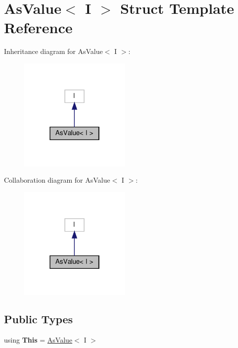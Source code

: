 \hypertarget{structAsValue}{}\section{As\+Value$<$ I $>$ Struct Template Reference}
\label{structAsValue}


Inheritance diagram for As\+Value$<$ I $>$\+:
\nopagebreak
\begin{figure}[H]
\begin{center}
\leavevmode
\includegraphics[width=154pt]{structAsValue__inherit__graph}
\end{center}
\end{figure}


Collaboration diagram for As\+Value$<$ I $>$\+:
\nopagebreak
\begin{figure}[H]
\begin{center}
\leavevmode
\includegraphics[width=154pt]{structAsValue__coll__graph}
\end{center}
\end{figure}
\subsection*{Public Types}
\begin{DoxyCompactItemize}
\item 
\mbox{\label{structAsValue_ac193a16f2751f437dc0a6d2835cb89e5}} 
using {\bfseries This} = \hyperlink{structAsValue}{As\+Value}$<$ I $>$
\end{DoxyCompactItemize}
